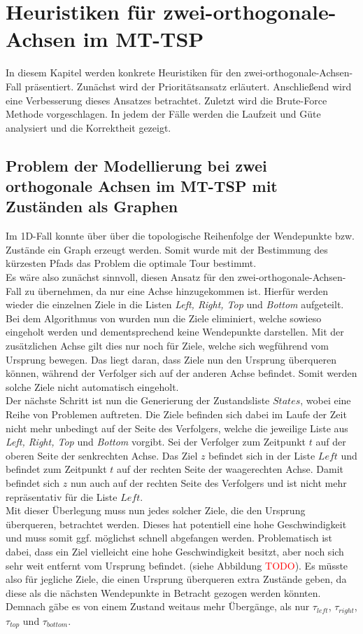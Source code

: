 \documentclass[german,version-2019-11]{uzl-thesis}
\begin{document}
\chapter{Heuristiken für zwei-orthogonale-Achsen im MT-TSP}

In diesem Kapitel werden konkrete Heuristiken für den zwei-orthogonale-Achsen-Fall präsentiert. Zunächst wird der Prioritätsansatz erläutert. Anschließend wird eine Verbesserung dieses Ansatzes betrachtet. Zuletzt wird die Brute-Force Methode vorgeschlagen. In jedem der Fälle werden die Laufzeit und Güte analysiert und die Korrektheit gezeigt.

\section{Problem der Modellierung bei zwei orthogonale Achsen im MT-TSP mit Zuständen als Graphen}
Im 1D-Fall konnte über über die topologische Reihenfolge der Wendepunkte bzw. Zustände ein Graph erzeugt werden. Somit wurde mit der Bestimmung des kürzesten Pfads das Problem die optimale Tour bestimmt. \\
Es wäre also zunächst sinnvoll, diesen Ansatz für den zwei-orthogonale-Achsen-Fall zu übernehmen, da nur eine Achse hinzugekommen ist. Hierfür werden wieder die einzelnen Ziele in die Listen \emph{Left, Right, Top} und \emph{Bottom} aufgeteilt. Bei dem Algorithmus von \cite{helvig} wurden nun die Ziele eliminiert, welche sowieso eingeholt werden und dementsprechend keine Wendepunkte darstellen. Mit der zusätzlichen Achse gilt dies nur noch für Ziele, welche sich wegführend vom Ursprung bewegen. Das liegt daran, dass Ziele nun den Ursprung überqueren können, während der Verfolger sich auf der anderen Achse befindet. Somit werden solche Ziele nicht automatisch eingeholt. \\
Der nächste Schritt ist nun die Generierung der Zustandsliste $States$, wobei eine Reihe von Problemen auftreten. Die Ziele befinden sich dabei im Laufe der Zeit nicht mehr unbedingt auf der Seite des Verfolgers, welche die jeweilige Liste aus \emph{Left, Right, Top} und \emph{Bottom} vorgibt. Sei der Verfolger zum Zeitpunkt $t$ auf der oberen Seite der senkrechten Achse. Das Ziel $z$ befindet sich in der Liste $Left$ und befindet zum Zeitpunkt $t$ auf der rechten Seite der waagerechten Achse. Damit befindet sich $z$ nun auch auf der rechten Seite des Verfolgers und ist nicht mehr repräsentativ für die Liste $Left$. \\
Mit dieser Überlegung muss nun jedes solcher Ziele, die den Ursprung überqueren, betrachtet werden. Dieses hat potentiell eine hohe Geschwindigkeit und muss somit ggf. möglichst schnell abgefangen werden. Problematisch ist dabei, dass ein Ziel vielleicht eine hohe Geschwindigkeit besitzt, aber noch sich sehr weit entfernt vom Ursprung befindet. (siehe Abbildung \textcolor{red}{TODO}). Es müsste also für jegliche Ziele, die einen Ursprung überqueren extra Zustände geben, da diese als die nächsten Wendepunkte in Betracht gezogen werden könnten. Demnach gäbe es von einem Zustand weitaus mehr Übergänge, als nur $\tau_{left}$, $\tau_{right}$, $\tau_{top}$ und $\tau_{bottom}$. \\
\end{document}
